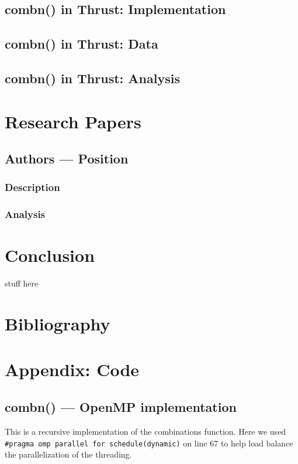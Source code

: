\documentclass[titlepage, 11pt]{article}
\begin{document}
\subsection{combn() in Thrust: Implementation}

\subsection{combn() in Thrust: Data}

\subsection{combn() in Thrust: Analysis}




\section{Research Papers}

\subsection{Authors --- Position}

\subsubsection{Description}

\subsubsection{Analysis}







\section{Conclusion}
stuff here




\section{Bibliography}


\pagebreak
\appendix
\section{Appendix: Code}
\subsection{combn() --- OpenMP implementation}

This is a recursive implementation of the combinations function. Here we used \verb; #pragma omp parallel for schedule(dynamic); on line 67 to help load balance the parallelization of the threading.  \\
\end{document}
